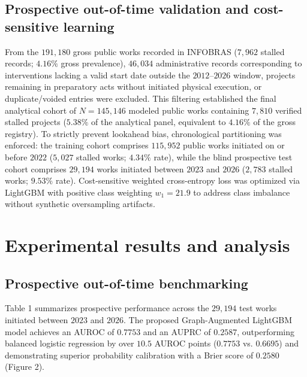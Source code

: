 \documentclass[10pt,a4paper]{article}
\begin{document}
\subsection*{Prospective out-of-time validation and cost-sensitive learning}
From the $191,180$ gross public works recorded in INFOBRAS ($7,962$ stalled records; $4.16\%$ gross prevalence), $46,034$ administrative records corresponding to interventions lacking a valid start date outside the $2012$--$2026$ window, projects remaining in preparatory acts without initiated physical execution, or duplicate/voided entries were excluded. This filtering established the final analytical cohort of $N = 145,146$ modeled public works containing $7,810$ verified stalled projects ($5.38\%$ of the analytical panel, equivalent to $4.16\%$ of the gross registry). To strictly prevent lookahead bias, chronological partitioning was enforced: the training cohort comprises $115,952$ public works initiated on or before $2022$ ($5,027$ stalled works; $4.34\%$ rate), while the blind prospective test cohort comprises $29,194$ works initiated between $2023$ and $2026$ ($2,783$ stalled works; $9.53\%$ rate). Cost-sensitive weighted cross-entropy loss was optimized via LightGBM \citep{ke2017lightgbm} with positive class weighting $w_1 = 21.9$ to address class imbalance without synthetic oversampling artifacts.

\section*{Experimental results and analysis}

\subsection*{Prospective out-of-time benchmarking}
Table 1 summarizes prospective performance across the $29,194$ test works initiated between $2023$ and $2026$. The proposed Graph-Augmented LightGBM model achieves an AUROC of $0.7753$ and an AUPRC of $0.2587$, outperforming balanced logistic regression by over $10.5$ AUROC points ($0.7753$ vs. $0.6695$) and demonstrating superior probability calibration with a Brier score of $0.2580$ (Figure 2).
\end{document}
